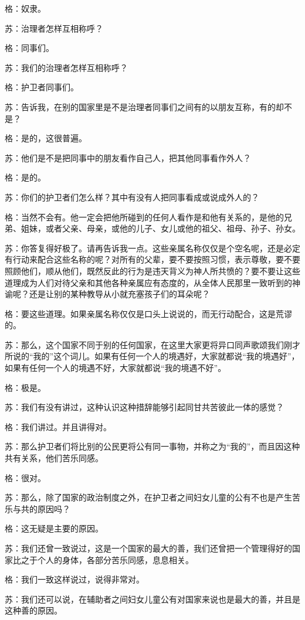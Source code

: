 \documentclass[12pt,oneside]{book}
\begin{document}
格：奴隶。

苏：治理者怎样互相称呼？

格：同事们。

苏：我们的治理者怎样互相称呼？

格：护卫者同事们。

苏：告诉我，在别的国家里是不是治理者同事们之间有的以朋友互称，有的却不是？

格：是的，这很普遍。

苏：他们是不是把同事中的朋友看作自己人，把其他同事看作外人？

格：是的。

苏：你们的护卫者们怎么样？其中有没有人把同事看成或说成外人的？

格：当然不会有。他一定会把他所碰到的任何人看作是和他有关系的，是他的兄弟、姐妹，或者父亲、母亲，或他的儿子、女儿或他的祖父、祖母、孙子、孙女。

苏：你答复得好极了。请再告诉我一点。这些亲属名称仅仅是个空名呢，还是必定有行动来配合这些名称的呢？对所有的父辈，要不要按照习惯，表示尊敬，要不要照顾他们，顺从他们，既然反此的行为是违天背义为神人所共愤的？要不要让这些道理成为人们对待父亲和其他各种亲属应有态度的，从全体人民那里一致听到的神谕呢？还是让别的某种教导从小就充塞孩子们的耳朵呢？

格：要这些道理。如果亲属名称仅仅是口头上说说的，而无行动配合，这是荒谬的。

苏：那么，这个国家不同于别的任何国家，在这里大家更将异口同声歌颂我们刚才所说的“我的”这个词儿。如果有任何一个人的境遇好，大家就都说“我的境遇好”，如果有任何一个人的境遇不好，大家就都说“我的境遇不好”。

格：极是。

苏：我们有没有讲过，这种认识这种措辞能够引起同甘共苦彼此一体的感觉？

格：我们讲过。并且讲得对。

苏：那么护卫者们将比别的公民更将公有同一事物，并称之为“我的”，而且因这种共有关系，他们苦乐同感。

格：很对。

苏：那么，除了国家的政治制度之外，在护卫者之间妇女儿童的公有不也是产生苦乐与共的原因吗？

格：这无疑是主要的原因。

苏：我们还曾一致说过，这是一个国家的最大的善，我们还曾把一个管理得好的国家比之于个人的身体，各部分苦乐同感，息息相关。

格：我们一致这样说过，说得非常对。

苏：我们还可以说，在辅助者之间妇女儿童公有对国家来说也是最大的善，并且是这种善的原因。
\end{document}
